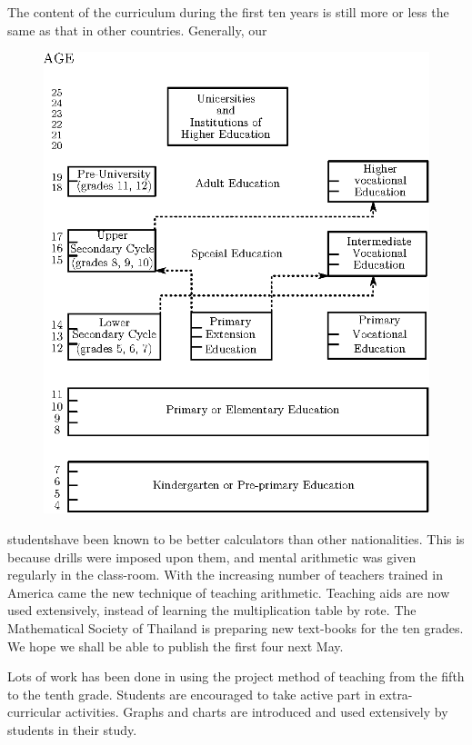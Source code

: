 The content of the curriculum during the first ten years is still more or less the same as that in other countries. Generally, our 
\begin{figure}[H]
\centering
\includegraphics{figures/fig_02.eps}
\end{figure} 

\setcounter{pageoriginal}{152}
\noindent
students\pageoriginale have been known to be better calculators than other nationalities. This is because drills were imposed upon them, and mental arithmetic was given regularly in the class-room. With the increasing number of teachers trained in America came the new technique of teaching arithmetic. Teaching aids are now used extensively, instead of learning the multiplication table by rote. The Mathematical Society of Thailand is preparing new text-books for the ten grades. We hope we shall be able to publish the first four next May.

Lots of work has been done in using the project method of teaching from the fifth to the tenth grade. Students are encouraged to take active part in extra-curricular activities. Graphs and charts are introduced and used extensively by students in their study.

